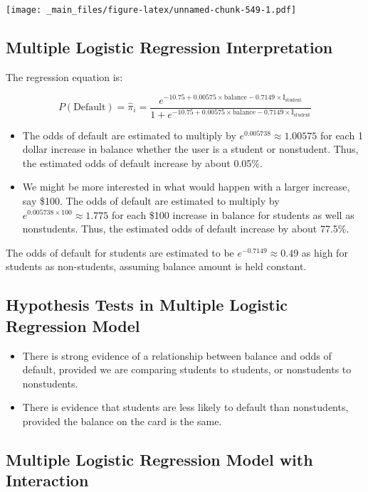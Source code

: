 \documentclass[]{book}
\begin{document}
\texttt{[image: \_main\_files/figure-latex/unnamed-chunk-549-1.pdf]}

\subsection{Multiple Logistic Regression
Interpretation}\label{multiple-logistic-regression-interpretation}

The regression equation is:

\[
P(\text{Default}) = \hat{\pi}_i =  \frac{e^{-10.75+0.00575\times\text{balance}-0.7149\times\text{I}_{\text{student}}}}{1+e^{-10.75+0.00575\times\text{balance}-0.7149\times\text{I}_{\text{student}}}}
\]

\begin{itemize}
\item
  The odds of default are estimated to multiply by
  \(e^{0.005738}\approx 1.00575\) for each 1 dollar increase in balance
  whether the user is a student or nonstudent. Thus, the estimated odds
  of default increase by about 0.05\%.
\item
  We might be more interested in what would happen with a larger
  increase, say \$100. The odds of default are estimated to multiply by
  \(e^{0.005738\times100}\approx 1.775\) for each \$100 increase in
  balance for students as well as nonstudents. Thus, the estimated odds
  of default increase by about 77.5\%.
\end{itemize}

The odds of default for students are estimated to be
\(e^{-0.7149} \approx 0.49\) as high for students as non-students,
assuming balance amount is held constant.

\subsection{Hypothesis Tests in Multiple Logistic Regression
Model}\label{hypothesis-tests-in-multiple-logistic-regression-model}

\begin{itemize}
\item
  There is strong evidence of a relationship between balance and odds of
  default, provided we are comparing students to students, or
  nonstudents to nonstudents.
\item
  There is evidence that students are less likely to default than
  nonstudents, provided the balance on the card is the same.
\end{itemize}

\subsection{Multiple Logistic Regression Model with
Interaction}\label{multiple-logistic-regression-model-with-interaction}
\end{document}
